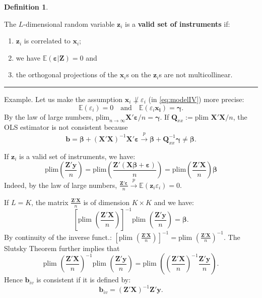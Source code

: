 \documentclass[
]{book}
\providecommand{\tightlist}{%
  \setlength{\itemsep}{0pt}\setlength{\parskip}{0pt}}
\theoremstyle{definition}
\newtheorem{definition}{Definition}[chapter]
\theoremstyle{definition}
\theoremstyle{definition}
\theoremstyle{definition}
\theoremstyle{remark}
\begin{document}
\begin{definition}
\protect\hypertarget{def:instruments}{}\label{def:instruments}

The \(L\)-dimensional random variable \(\mathbf{z}_i\) is a \textbf{valid set of instruments} if:

\begin{enumerate}
\def\labelenumi{\alph{enumi}.}
\tightlist
\item
  \(\mathbf{z}_i\) is correlated to \(\mathbf{x}_i\);
\item
  we have \(\mathbb{E}(\boldsymbol\varepsilon|\mathbf{Z})=0\) and
\item
  the orthogonal projections of the \(\mathbf{x}_i\)s on the \(\mathbf{z}_i\)s are not multicollinear.
\end{enumerate}

\end{definition}

\begin{center}\rule{0.5\linewidth}{0.5pt}\end{center}

Example. Let us make the assumption \(\mathbf{x}_i\not\perp \varepsilon_i\) (in \eqref{eq:modelIV}) more precise:
\begin{equation}
\mathbb{E}(\varepsilon_i)=0 \quad \mbox{and} \quad \mathbb{E}(\varepsilon_i \mathbf{x_i})=\boldsymbol\gamma.\label{eq:exmIV}
\end{equation}
By the law of large numbers, \(\mbox{plim}_{n \rightarrow \infty} \mathbf{X}'\boldsymbol\varepsilon / n = \boldsymbol\gamma\). If \(\mathbf{Q}_{xx} := \mbox{plim } \mathbf{X}'\mathbf{X}/n\), the OLS estimator is not consistent because
\[
\mathbf{b} = \boldsymbol\beta + (\mathbf{X}'\mathbf{X})^{-1}\mathbf{X}'\boldsymbol\varepsilon \overset{p}{\rightarrow} \boldsymbol\beta + \mathbf{Q}_{xx}^{-1}\boldsymbol\gamma \ne \boldsymbol\beta.
\]

If \(\mathbf{z}_i\) is a valid set of instruments, we have:
\[
\mbox{plim}\left( \frac{\mathbf{Z}'\mathbf{y}}{n} \right) =\mbox{plim}\left( \frac{\mathbf{Z}'(\mathbf{X}\boldsymbol\beta + \boldsymbol\varepsilon)}{n} \right) = \mbox{plim}\left( \frac{\mathbf{Z}'\mathbf{X}}{n} \right)\boldsymbol\beta
\]
Indeed, by the law of large numbers, \(\frac{\mathbf{Z}'\boldsymbol\varepsilon}{n} \overset{p}{\rightarrow}\mathbb{E}(\mathbf{z}_i\varepsilon_i)=0\).

If \(L = K\), the matrix \(\frac{\mathbf{Z}'\mathbf{X}}{n}\) is of dimension \(K \times K\) and we have:
\[
\left[\mbox{plim }\left( \frac{\mathbf{Z}'\mathbf{X}}{n} \right)\right]^{-1}\mbox{plim }\left( \frac{\mathbf{Z}'\mathbf{y}}{n} \right) = \boldsymbol\beta.
\]
By continuity of the inverse funct.: \(\left[\mbox{plim }\left( \frac{\mathbf{Z}'\mathbf{X}}{n} \right)\right]^{-1}=\mbox{plim }\left( \frac{\mathbf{Z}'\mathbf{X}}{n} \right)^{-1}\).
The Slutsky Theorem further implies that
\[
\mbox{plim }\left( \frac{\mathbf{Z}'\mathbf{X}}{n} \right)^{-1} \mbox{plim }\left( \frac{\mathbf{Z}'\mathbf{y}}{n} \right)  = \mbox{plim }\left( \left( \frac{\mathbf{Z}'\mathbf{X}}{n} \right)^{-1} \frac{\mathbf{Z}'\mathbf{y}}{n} \right).
\]
Hence \(\mathbf{b}_{iv}\) is consistent if it is defined by:
\[
\boxed{\mathbf{b}_{iv} = (\mathbf{Z}'\mathbf{X})^{-1}\mathbf{Z}'\mathbf{y}.}
\]
\end{document}
